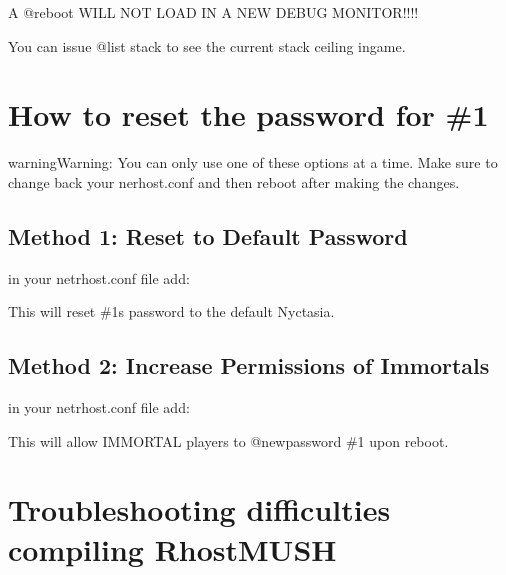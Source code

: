 \documentclass[letterpaper,10pt,english]{sphinxmanual}
\begin{document}
\sphinxAtStartPar
A @reboot WILL NOT LOAD IN A NEW DEBUG MONITOR!!!!

\sphinxAtStartPar
You can issue @list stack to see the current stack ceiling ingame.


\section{How to reset the password for \#1}
\label{\detokenize{troubleshooting:how-to-reset-the-password-for-1}}
\begin{sphinxadmonition}{warning}{Warning:}
\sphinxAtStartPar
You can only use one of these options at a time. Make sure to change back your nerhost.conf and then reboot after making the changes.
\end{sphinxadmonition}


\subsection{Method 1: Reset to Default Password}
\label{\detokenize{troubleshooting:method-1-reset-to-default-password}}
\sphinxAtStartPar
in your netrhost.conf file add:

\begin{sphinxVerbatim}[commandchars=\\\{\}]
 
\end{sphinxVerbatim}

\sphinxAtStartPar
This will reset \#1\textquotesingle{}s password to the default \textquotesingle{}Nyctasia\textquotesingle{}.


\subsection{Method 2: Increase Permissions of Immortals}
\label{\detokenize{troubleshooting:method-2-increase-permissions-of-immortals}}
\sphinxAtStartPar
in your netrhost.conf file add:

\begin{sphinxVerbatim}[commandchars=\\\{\}]
 
\end{sphinxVerbatim}

\sphinxAtStartPar
This will allow IMMORTAL players to @newpassword \#1 upon reboot.


\section{Troubleshooting difficulties compiling RhostMUSH}
\label{\detokenize{troubleshooting:troubleshooting-difficulties-compiling-rhostmush}}
\end{document}
